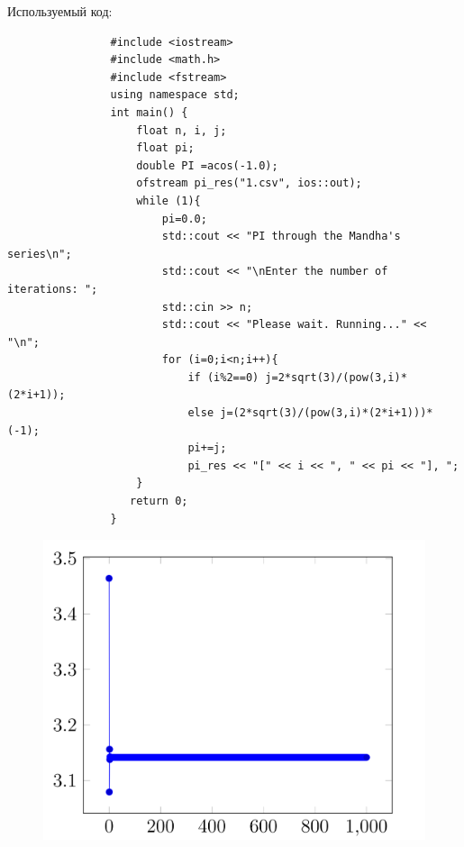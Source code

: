 \documentclass[a4paper, 12pt]{article}
\begin{document}
\begin{enumerate}
\begin{enumerate}
                        Используемый код:
                        \begin{lstlisting}            
                #include <iostream>
                #include <math.h>
                #include <fstream>
                using namespace std;
                int main() {
                    float n, i, j;
                    float pi;
                    double PI =acos(-1.0);
                    ofstream pi_res("1.csv", ios::out);
                    while (1){
                        pi=0.0;
                        std::cout << "PI through the Mandha's series\n";
                        std::cout << "\nEnter the number of iterations: ";
                        std::cin >> n;
                        std::cout << "Please wait. Running..." << "\n";
                        for (i=0;i<n;i++){
                            if (i%2==0) j=2*sqrt(3)/(pow(3,i)*(2*i+1));
                            else j=(2*sqrt(3)/(pow(3,i)*(2*i+1)))*(-1);
                            pi+=j;
                            pi_res << "[" << i << ", " << pi << "], ";
                    }
                   return 0;
                }  
                        \end{lstlisting}
                        \bigskip
                        \begin{figure}[h!]
        		        \centering
    		              \includegraphics[scale = 0.22]{4-1.png}

\end{figure}
\end{enumerate}
\end{enumerate}
\end{document}
